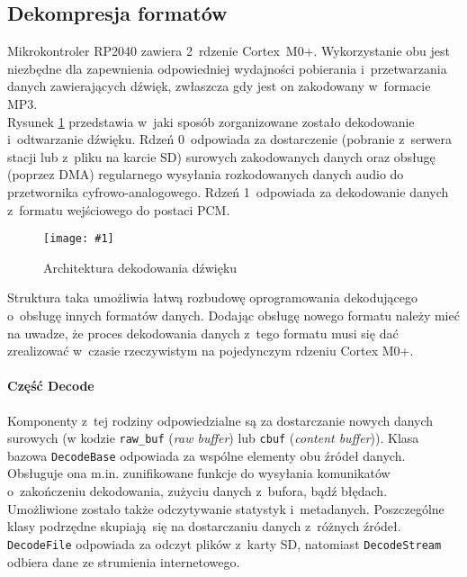 \documentclass[polish]{aghengthesis}
\newcommand{\imgint}[4]{
	\begin{figure}[{#4}]
		\centering
		\texttt{[image: \#1]}
		\caption{#2}
		\label{#1}
	\end{figure}
}
\newcommand{\imgh}[3]{\imgint{#1}{#2}{#3}{H}}
\begin{document}
		\subsection{Dekompresja formatów}
			\label{sec:decode}
			
			Mikrokontroler RP2040 zawiera 2~rdzenie Cortex~M0+. Wykorzystanie obu jest niezbędne dla zapewnienia odpowiedniej wydajności pobierania i~przetwarzania danych zawierających dźwięk, zwłaszcza gdy jest on zakodowany w~formacie MP3.
			$ $\\
			
			Rysunek \ref{3/PicoRadio-sound-decoding} przedstawia w~jaki sposób zorganizowane zostało dekodowanie i~odtwarzanie dźwięku.
			Rdzeń 0~odpowiada za dostarczenie (pobranie z~serwera stacji lub z~pliku na karcie SD) surowych zakodowanych danych oraz obsługę (poprzez DMA) regularnego wysyłania rozkodowanych danych audio do przetwornika cyfrowo-analogowego.
			Rdzeń 1~odpowiada za dekodowanie danych z~formatu wejściowego do postaci PCM.
			\imgh{3/PicoRadio-sound-decoding}{Architektura dekodowania dźwięku}{0.95}
			
			Struktura taka umożliwia łatwą rozbudowę oprogramowania dekodującego o~obsługę innych formatów danych. Dodając obsługę nowego formatu należy mieć na uwadze, że proces dekodowania danych z~tego formatu musi się dać zrealizować w~czasie rzeczywistym na pojedynczym rdzeniu Cortex M0+.
			
		
			\paragraph{Część Decode}
				Komponenty z~tej rodziny odpowiedzialne są za dostarczanie nowych danych surowych (w kodzie \lstinline|raw_buf| (\textit{raw buffer}) lub \lstinline|cbuf| (\textit{content buffer})). Klasa bazowa \lstinline|DecodeBase| odpowiada za wspólne elementy obu źródeł danych. Obsługuje ona m.in. zunifikowane funkcje do wysyłania komunikatów o~zakończeniu dekodowania, zużyciu danych z~bufora, bądź błędach. Umożliwione zostało także odczytywanie statystyk i~metadanych. Poszczególne klasy podrzędne skupiają się na dostarczaniu danych z~różnych źródeł. \lstinline|DecodeFile| odpowiada za odczyt plików z~karty SD, natomiast \lstinline|DecodeStream| odbiera dane ze strumienia internetowego.
			
\end{document}

